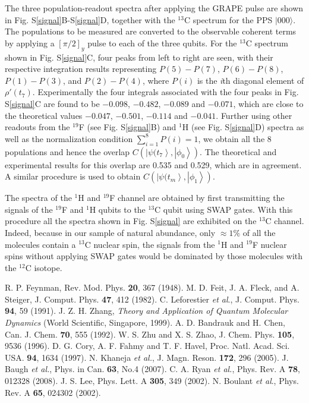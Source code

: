 \documentclass[twocolumn,showpacs,twoside,10pt,prl]{revtex4}
\begin{document}
 The three population-readout spectra after applying the GRAPE pulse
 are shown in Fig. S\ref{signal}B-S\ref{signal}D, together with the $^{13}$C spectrum for the PPS $|000\rangle$.
 The populations to be measured are converted to the observable coherent terms by applying a $[\pi/2]_y$ pulse to each of the three qubits.   For the $^{13}$C spectrum shown in Fig. S\ref{signal}C, four peaks from left to right are seen, with their respective integration results representing $P(5)-P(7)$, $P(6)-P(8)$, $P(1)-P(3)$, and $P(2)-P(4)$, where $P(i)$ is the  \emph{i}th diagonal element of $\rho'(t_7)$.  Experimentally the four integrals associated with the four peaks in Fig. S\ref{signal}C are found to be $-0.098$, $-0.482$, $-0.089$ and $-0.071$, which are close to the theoretical values $-0.047$, $-0.501$, $-0.114$ and $-0.041$.
 Further using other readouts from the $^{19}$F (see Fig. S\ref{signal}B) and $^1$H (see Fig. S\ref{signal}D) spectra as well as the normalization condition $\sum_{i=1}^{8} {P}({i})=1$, we obtain all the 8 populations and hence the overlap $C(\left\vert \psi(t_{7} \right\rangle,\left\vert \phi_{0} \right\rangle)$.  The theoretical and experimental results for this overlap are 0.535 and 0.529, which are in agreement.
 A similar procedure is used to obtain $C(\left\vert \psi(t_{m} \right\rangle,\left\vert \phi_{1} \right\rangle)$.

 The spectra of the ${}^{1}$H and ${}^{19}$F channel are obtained by first transmitting the signals of the $^{19}$F and $^1$H qubits to the $^{13}$C qubit using SWAP gates. With this procedure all the spectra shown in Fig. S\ref{signal} are exhibited on the $^{13}$C channel.  Indeed, because
 in our sample of natural abundance, only $\approx 1\%$ of all the molecules contain a ${}^{13}$C nuclear spin,
 the signals from the ${}^{1}$H and ${}^{19}$F nuclear spins  without applying SWAP gates would be
  dominated by those molecules with the ${}^{12}$C isotope.




\begin{thebibliography}{99}
 R. P. Feynman, Rev. Mod. Phys. \textbf{20}, 367 (1948).
 M. D. Feit, J. A. Fleck, and A. Steiger, J. Comput. Phys. \textbf{47}, 412 (1982).
 C. Leforestier \emph{et al}., J. Comput. Phys. \textbf{94}, 59 (1991).
 J. Z. H. Zhang, {\it Theory and Application of Quantum Molecular Dynamics}
 (World Scientific, Singapore, 1999).
 A. D. Bandrauk and H. Chen, Can. J. Chem. {\bf 70}, 555 (1992).
 W. S. Zhu and X. S. Zhao, J. Chem. Phys. {\bf 105}, 9536 (1996).
 D. G. Cory, A. F. Fahmy and T. F. Havel, Proc. Natl. Acad. Sci. USA. \textbf{94}, 1634 (1997).
 N. Khaneja \emph{et al.}, J. Magn. Reson. \textbf{172}, 296 (2005).
 J. Baugh \emph{et al.}, Phys. in Can. \textbf{63}, No.4
(2007).
 C. A. Ryan \emph{et al.}, Phys. Rev. A \textbf{78}, 012328 (2008).
 J. S. Lee, Phys. Lett. A \textbf{305}, 349 (2002).
 N. Boulant \emph{et al}., Phys. Rev. A \textbf{65}, 024302 (2002).
\end{thebibliography}
\end{document}
